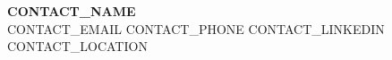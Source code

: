 \documentclass[letterpaper,11pt]{article}
\begin{document}
{\huge\bfseries {{{CONTACT_NAME}}}}\\[2pt]
\small {{{CONTACT_EMAIL}}} \; {{{CONTACT_PHONE}}} \; {{{CONTACT_LINKEDIN}}} \; {{{CONTACT_LOCATION}}}
\vspace{6pt}








\end{document}
